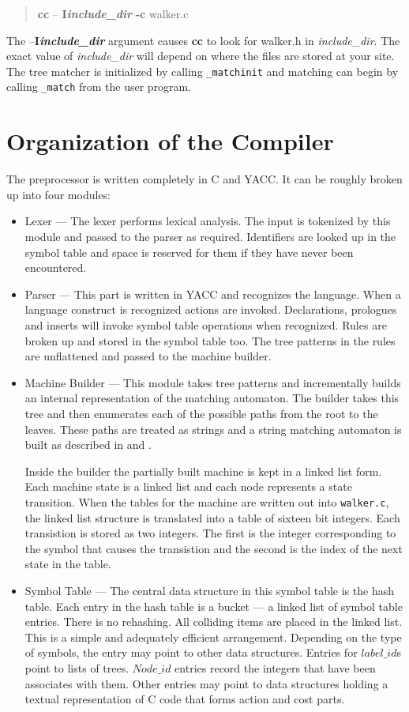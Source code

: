 \begin{verse}
{\bf cc} -- {\bf I\sl include\_dir} {\bf -c} walker.c
\end{verse}

The --{\bf I\sl include\_dir} argument causes {\bf cc} to look for
walker.h in {\sl include\_dir}.  The exact value of {\sl include\_dir}
will depend on where the files are stored at your site.
The tree matcher is initialized by calling {\tt \_matchinit} and matching
can begin by calling {\tt \_match} from
the user program.

\section{Organization of the \Twigcomp{} Compiler}
The preprocessor is written completely in C and YACC.
It can be roughly broken up into four modules:
\begin{itemize}
\item Lexer --- The lexer performs lexical analysis.
The input is tokenized by this module and passed to the parser
as required.  Identifiers are looked up in the symbol table
and space is reserved for them if they have never been encountered.
\item Parser --- This part is written in YACC and recognizes the
\twiglang{} language.  When a language construct is recognized actions
are invoked.  Declarations, prologues and inserts will invoke symbol
table operations when recognized.  Rules are broken up and stored
in the symbol table too.  The tree patterns in the rules are unflattened
and passed to the machine builder.
\item Machine Builder --- This module takes tree patterns and incrementally
builds an internal representation of the matching automaton.
The builder takes this
tree and then enumerates each of the possible paths from the root to the
leaves.  These paths are treated as strings and a string matching automaton
is built as described in \cite{fgrep} and \cite{treematch}.

Inside the builder the partially built machine is kept in a linked list
form.  Each machine state is a linked list and each node represents
a state transition.  When the tables for the machine are written out into {
\tt walker.c}, the linked list structure is
translated into a table of sixteen bit integers.
Each transistion is stored as two integers.  The first is
the integer corresponding to the symbol that causes the transistion and the
second is the index of the next state in the table.

\item Symbol Table ---  The central data structure in this symbol table is
the hash table.
Each entry in the hash table is a bucket --- a linked list of symbol table
entries.  There is no rehashing.  All colliding items are placed
in the linked list.
This is a simple
and adequately efficient arrangement.  Depending on the type of symbols, the
entry may point to other data structures.  Entries for $label\_id$s point to
lists of trees.  $Node\_id$ entries record the integers that have been
associates with them.  Other entries may point to data structures holding a
textual representation of C code that forms action and cost parts.
\end{itemize}

